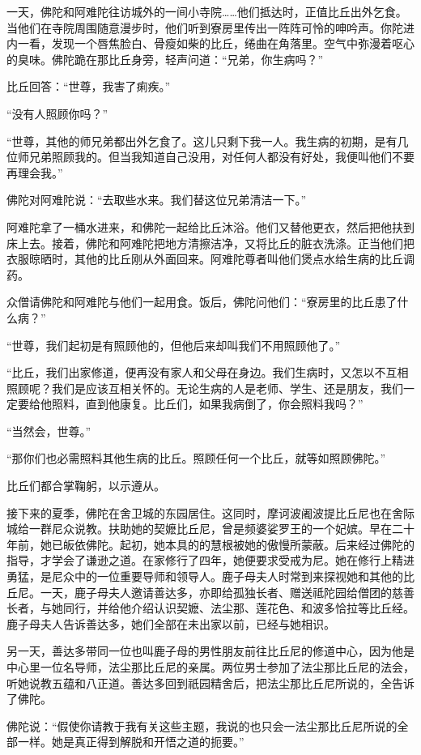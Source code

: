 \documentclass[12pt,twoside,openany]{book}
\begin{document}
一天，佛陀和阿难陀往访城外的一间小寺院……他们抵达时，正值比丘出外乞食。当他们在寺院周围随意漫步时，他们听到寮房里传出一阵阵可怜的呻吟声。你陀进内一看，发现一个唇焦脸白、骨瘦如柴的比丘，绻曲在角落里。空气中弥漫着呕心的臭味。佛陀跪在那比丘身旁，轻声问道：“兄弟，你生病吗？”

比丘回答：“世尊，我害了痢疾。”

“没有人照顾你吗？”

“世尊，其他的师兄弟都出外乞食了。这儿只剩下我一人。我生病的初期，是有几位师兄弟照顾我的。但当我知道自己没用，对任何人都没有好处，我便叫他们不要再理会我。”

佛陀对阿难陀说：“去取些水来。我们替这位兄弟清洁一下。”

阿难陀拿了一桶水进来，和佛陀一起给比丘沐浴。他们又替他更衣，然后把他扶到床上去。接着，佛陀和阿难陀把地方清擦洁净，又将比丘的脏衣洗涤。正当他们把衣服晾晒时，其他的比丘刚从外面回来。阿难陀尊者叫他们煲点水给生病的比丘调药。

众僧请佛陀和阿难陀与他们一起用食。饭后，佛陀问他们：“寮房里的比丘患了什么病？”

“世尊，我们起初是有照顾他的，但他后来却叫我们不用照顾他了。”

“比丘，我们出家修道，便再没有家人和父母在身边。我们生病时，又怎以不互相照顾呢？我们是应该互相关怀的。无论生病的人是老师、学生、还是朋友，我们一定要给他照料，直到他康复。比丘们，如果我病倒了，你会照料我吗？”

“当然会，世尊。”

“那你们也必需照料其他生病的比丘。照顾任何一个比丘，就等如照顾佛陀。”

比丘们都合掌鞠躬，以示遵从。

接下来的夏季，佛陀在舍卫城的东园居住。这同时，摩诃波阇波提比丘尼也在舍际城给一群尼众说教。扶助她的契嬷比丘尼，曾是频婆娑罗王的一个妃嫔。早在二十年前，她已皈依佛陀。起初，她本具的的慧根被她的傲慢所蒙蔽。后来经过佛陀的指导，才学会了谦逊之道。在家修行了四年，她便要求受戒为尼。她在修行上精进勇猛，是尼众中的一位重要导师和领导人。鹿子母夫人时常到来探视她和其他的比丘尼。一天，鹿子母夫人邀请善达多，亦即给孤独长者、赠送祗陀园给僧团的慈善长者，与她同行，并给他介绍认识契嬷、法尘那、莲花色、和波多恰拉等比丘经。鹿子母夫人告诉善达多，她们全部在未出家以前，已经与她相识。

另一天，善达多带同一位也叫鹿子母的男性朋友前往比丘尼的修道中心，因为他是中心里一位名导师，法尘那比丘尼的亲属。两位男士参加了法尘那比丘尼的法会，听她说教五蕴和八正道。善达多回到祇园精舍后，把法尘那比丘尼所说的，全告诉了佛陀。

佛陀说：“假使你请教于我有关这些主题，我说的也只会一法尘那比丘尼所说的全部一样。她是真正得到解脱和开悟之道的扼要。”
\end{document}
